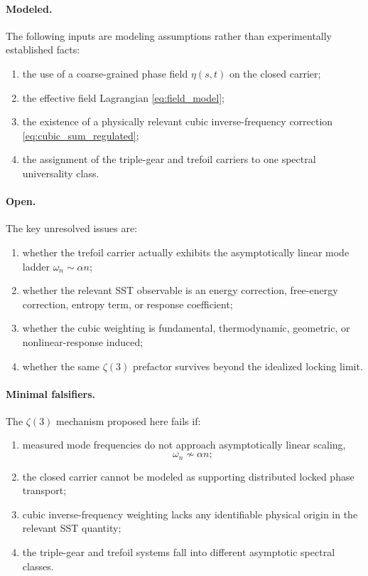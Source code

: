 \documentclass[11pt]{article}
\begin{document}
    \paragraph{Modeled.}
        The following inputs are modeling assumptions rather than experimentally established facts:
        \begin{enumerate}
            \item the use of a coarse-grained phase field \(\eta(s,t)\) on the closed carrier;
            \item the effective field Lagrangian \eqref{eq:field_model};
            \item the existence of a physically relevant cubic inverse-frequency correction \eqref{eq:cubic_sum_regulated};
            \item the assignment of the triple-gear and trefoil carriers to one spectral universality class.
        \end{enumerate}
    
    \paragraph{Open.}
        The key unresolved issues are:
        \begin{enumerate}
            \item whether the trefoil carrier actually exhibits the asymptotically linear mode ladder \(\omega_n\sim \alpha n\);
            \item whether the relevant SST observable is an energy correction, free-energy correction, entropy term, or response coefficient;
            \item whether the cubic weighting is fundamental, thermodynamic, geometric, or nonlinear-response induced;
            \item whether the same \(\zeta(3)\) prefactor survives beyond the idealized locking limit.
        \end{enumerate}
    
    \paragraph{Minimal falsifiers.}
        The \(\zeta(3)\) mechanism proposed here fails if:
        \begin{enumerate}
            \item measured mode frequencies do not approach asymptotically linear scaling,
            \[
                \omega_n \not\sim \alpha n;
            \]
            \item the closed carrier cannot be modeled as supporting distributed locked phase transport;
            \item cubic inverse-frequency weighting lacks any identifiable physical origin in the relevant SST quantity;
            \item the triple-gear and trefoil systems fall into different asymptotic spectral classes.
        \end{enumerate}
    
\end{document}
